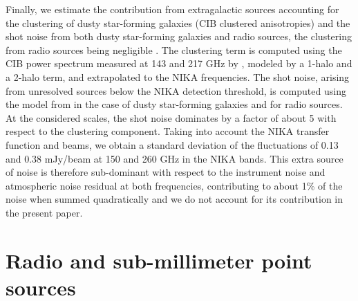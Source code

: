 \documentclass[twocolumn,traditabstract]{aa}
\begin{document}
Finally, we estimate the contribution from extragalactic sources accounting for the clustering of dusty star-forming galaxies (CIB clustered anisotropies) and the shot noise from both dusty star-forming galaxies and radio sources, the clustering from radio sources being negligible \citep{hall2010}. The clustering term is computed using the CIB power spectrum measured at 143 and 217 GHz by \cite{planck2014XXX}, modeled by a 1-halo and a 2-halo term, and extrapolated to the NIKA frequencies. The shot noise, arising from unresolved sources below the NIKA detection threshold, is computed using the model from \cite{bethermin2012} in the case of dusty star-forming galaxies and \cite{tucci2011} for radio sources. At the considered scales, the shot noise dominates by a factor of about 5 with respect to the clustering component. Taking into account the NIKA transfer function and beams, we obtain a standard deviation of the fluctuations of 0.13 and 0.38 mJy/beam at 150 and 260 GHz in the NIKA bands. This extra source of noise is therefore sub-dominant with respect to the instrument noise and atmospheric noise residual at both frequencies, contributing to about 1\% of the noise when summed quadratically and we do not account for its contribution in the present paper.

\section{Radio and sub-millimeter point sources}\label{Radio_and_infrared_point_sources}
\end{document}
